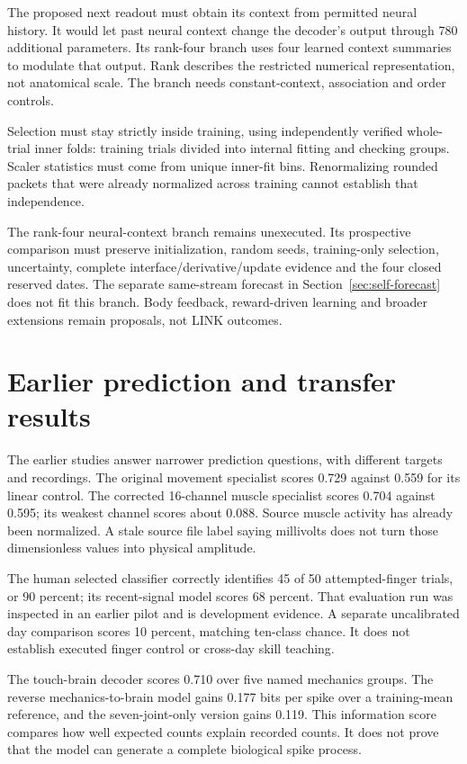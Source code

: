 The proposed next readout must obtain its context from permitted neural history. It would let past neural context change the decoder's output through 780 additional parameters. Its rank-four branch uses four learned context summaries to modulate that output. Rank describes the restricted numerical representation, not anatomical scale. The branch needs constant-context, association and order controls.

Selection must stay strictly inside training, using independently verified whole-trial inner folds: training trials divided into internal fitting and checking groups. Scaler statistics must come from unique inner-fit bins. Renormalizing rounded packets that were already normalized across training cannot establish that independence.

The rank-four neural-context branch remains unexecuted. Its prospective comparison must preserve initialization, random seeds, training-only selection, uncertainty, complete interface/derivative/update evidence and the four closed reserved dates. The separate same-stream forecast in Section~\ref{sec:self-forecast} does not fit this branch. Body feedback, reward-driven learning and broader extensions remain proposals, not LINK outcomes.




\section{Earlier prediction and transfer results}

The earlier studies answer narrower prediction questions, with different targets and recordings. The original movement specialist scores 0.729 against 0.559 for its linear
control. The corrected 16-channel muscle specialist scores 0.704 against
0.595; its weakest channel scores about 0.088. Source muscle activity has
already been normalized. A stale source file label saying millivolts does not
turn those dimensionless values into physical amplitude.

The human selected classifier correctly identifies 45 of 50 attempted-finger
trials, or 90 percent; its recent-signal model scores 68 percent. That evaluation
run was inspected in an earlier pilot and is development evidence. A separate
uncalibrated day comparison scores 10 percent, matching ten-class chance.
It does not establish executed finger control or cross-day skill teaching.

The touch-brain decoder scores 0.710 over five named mechanics groups. The
reverse mechanics-to-brain model gains 0.177 bits per spike over a training-mean
reference, and the seven-joint-only version gains 0.119. This information score
compares how well expected counts explain recorded counts. It does not prove
that the model can generate a complete biological spike process.

